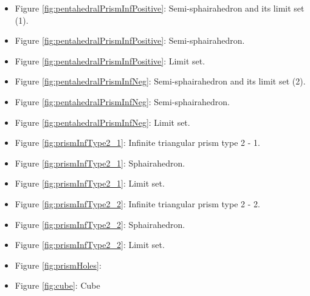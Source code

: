 \documentclass[suppldata, dvipdfmx]{interact}
\theoremstyle{plain}%
\theoremstyle{definition}
\theoremstyle{remark}
\theoremstyle{problemstyle}
\begin{document}
\begin{itemize}
\item Figure \ref{fig:pentahedralPrismInfPositive}: Semi-sphairahedron and its limit set (1). 
\item Figure
      \ref{fig:pentahedralPrismInfPositive}: Semi-sphairahedron.
\item Figure
      \ref{fig:pentahedralPrismInfPositive}:
      Limit set.


\item Figure \ref{fig:pentahedralPrismInfNeg}: Semi-sphairahedron and its limit set (2).
\item Figure
      \ref{fig:pentahedralPrismInfNeg}:
      Semi-sphairahedron.
\item Figure
      \ref{fig:pentahedralPrismInfNeg}:
      Limit set.
\item Figure \ref{fig:prismInfType2_1}: Infinite triangular prism type 2 - 1.
\item Figure \ref{fig:prismInfType2_1}: Sphairahedron.
\item Figure \ref{fig:prismInfType2_1}: Limit set.
\item Figure \ref{fig:prismInfType2_2}: Infinite triangular prism type 2 - 2.
\item Figure \ref{fig:prismInfType2_2}: Sphairahedron.
\item Figure \ref{fig:prismInfType2_2}: Limit set.
\item Figure \ref{fig:prismHoles}:
\item Figure \ref{fig:cube}: Cube


\end{itemize}
\end{document}
